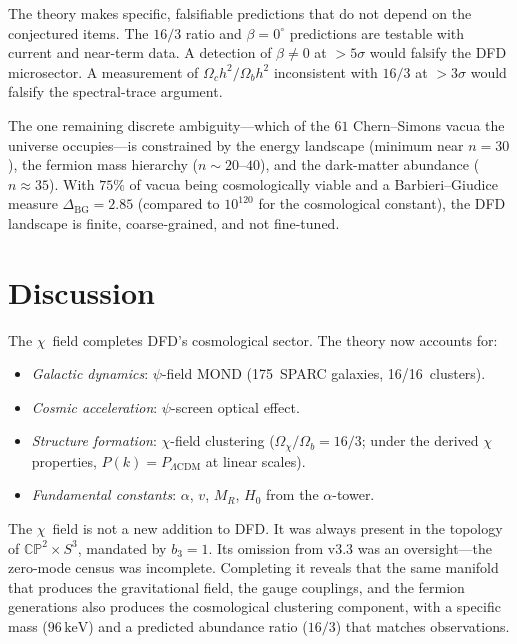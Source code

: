 \documentclass[aps,prd,twocolumn,superscriptaddress,showpacs,floatfix,nofootinbib]{revtex4-2}
\theoremstyle{definition}
\theoremstyle{remark}
\newcommand{\CP}{\mathbb{CP}}
\newcommand{\Sph}{S}
\newcommand{\keV}{\,\mathrm{keV}}
\newcommand{\LCDM}{\Lambda\mathrm{CDM}}
\begin{document}
The theory makes specific, falsifiable predictions that
do not depend on the conjectured items. The $16/3$ ratio
and $\beta=0^\circ$ predictions are testable with current
and near-term data. A detection of $\beta\neq 0$ at
$>5\sigma$ would falsify the DFD microsector. A measurement
of $\Omega_c h^2/\Omega_b h^2$ inconsistent with $16/3$
at $>3\sigma$ would falsify the spectral-trace argument.

The one remaining discrete ambiguity---which of the $61$
Chern--Simons vacua the universe occupies---is constrained
by the energy landscape (minimum near $n=30$), the fermion
mass hierarchy ($n\sim 20$--$40$), and the dark-matter
abundance ($n\approx 35$). With $75\%$ of vacua being
cosmologically viable and a Barbieri--Giudice measure
$\Delta_{\mathrm{BG}}=2.85$ (compared to $10^{120}$ for
the cosmological constant), the DFD landscape is finite,
coarse-grained, and not fine-tuned.

\section{Discussion}
\label{sec:discussion}

The $\chi$~field completes DFD's cosmological sector.
The theory now accounts for:
\begin{itemize}
\item \emph{Galactic dynamics}: $\psi$-field MOND
  (175~SPARC galaxies, 16/16~clusters).
\item \emph{Cosmic acceleration}: $\psi$-screen optical effect.
\item \emph{Structure formation}: $\chi$-field clustering
  ($\Omega_\chi/\Omega_b = 16/3$; under the derived $\chi$
  properties, $P(k)=P_{\LCDM}$ at linear scales).
\item \emph{Fundamental constants}: $\alpha$, $v$, $M_R$,
  $H_0$ from the $\alpha$-tower.
\end{itemize}

The $\chi$~field is not a new addition to DFD. It was
always present in the topology of $\CP^2\times\Sph^3$,
mandated by $b_3=1$. Its omission from v3.3 was an
oversight---the zero-mode census was incomplete.
Completing it reveals that the same manifold that produces
the gravitational field, the gauge couplings, and the
fermion generations also produces the cosmological
clustering component, with a specific mass ($96\keV$)
and a predicted abundance ratio ($16/3$) that matches
observations.
\end{document}
